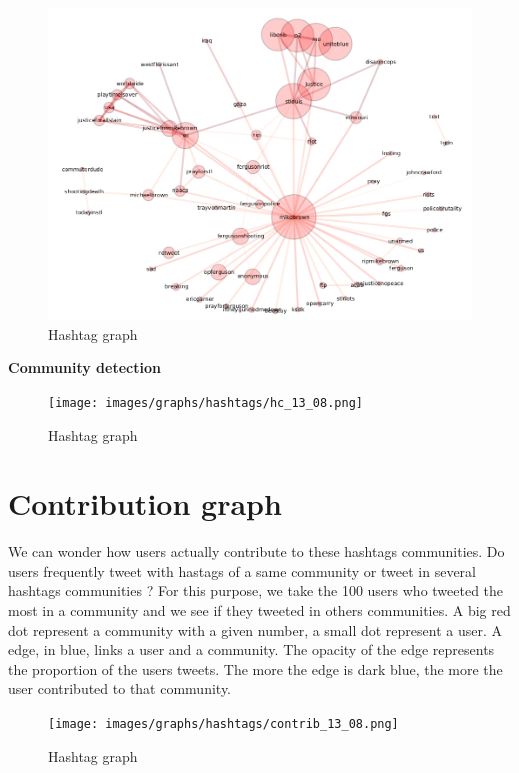 \documentclass[a4paper,twoside,12pt,openright]{report}
\begin{document}
\begin{figure}[H]
\centering
\includegraphics[width=\textwidth]{images/graphs/hashtags/11_08.png}
\caption{Hashtag graph}
\end{figure}

\textbf{Community detection}

\begin{figure}[H]
\centering
\texttt{[image: images/graphs/hashtags/hc\_13\_08.png]}
\caption{Hashtag graph}
\end{figure}


\newpage
\section{Contribution graph}

We can wonder how users actually contribute to these hashtags communities. Do users frequently tweet with hastags of a same community or tweet in several hashtags communities ? For this purpose, we take the 100 users who tweeted the most in a community and we see if they tweeted in others communities. A big red dot represent a community with a given number, a small dot represent a user. A edge, in blue, links a user and a community. The opacity of the edge represents the proportion of the users tweets. The more the edge is dark blue, the more the user contributed to that community. 

\begin{figure}[H]
\centering
\texttt{[image: images/graphs/hashtags/contrib\_13\_08.png]}
\caption{Hashtag graph}
\end{figure}
\end{document}
